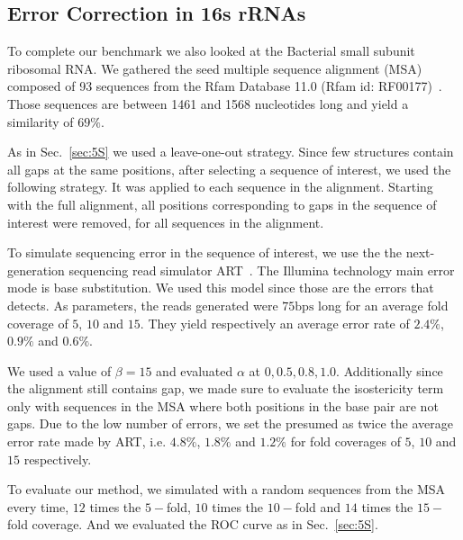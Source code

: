 \subsection{Error Correction in 16s rRNAs}
\label{sec:16S}

To complete our benchmark we also looked at the Bacterial small subunit ribosomal RNA. 
We gathered the seed multiple sequence alignment (MSA) composed of 93 sequences from the Rfam Database 11.0 (Rfam id: RF00177)~\cite{gardner2011rfam}.
Those sequences are between 1461 and 1568 nucleotides long and yield a similarity of $69\%$.

As in Sec.~\ref{sec:5S} we used a leave-one-out strategy. Since few structures contain all gaps 
at the same positions, after selecting a sequence of interest,  we used the following strategy.
 It was applied to each sequence in the alignment. Starting with the full alignment, all positions corresponding to gaps in the sequence of interest were removed, for all sequences in the alignment.  

To simulate sequencing error in the sequence of interest,
 we use the the next-generation sequencing read simulator 
ART~\cite{huang2012art}. The Illumina technology main error mode is base substitution. We used
this model since those
are the errors that \RNApyro detects. As parameters, the reads  generated
were $75\text{bps}$ long for an average fold coverage of $5$, $10$ and $15$. 
 They yield respectively an average error rate of $2.4\%$, $0.9\%$ and $0.6\%$.
 
We used a value of $\beta=15$ and evaluated $\alpha$ at $0, 0.5, 0.8, 1.0$. 
 Additionally since the alignment still contains gap, we made sure to evaluate the isostericity 
 term only
 with sequences in the MSA where both positions in the base pair are not gaps. 
 Due to the low number of errors, we set the presumed as twice the average error rate made by ART, i.e. $4.8\%$, $1.8\%$ and $1.2\%$ for fold coverages of $5$, $10$ and $15$ respectively.

To evaluate our method, we simulated with a random sequences from the MSA every time,
 $12$ times the $5-$fold, $10$ times the $10-$fold and $14$ times the $15-$fold coverage. And we 
 evaluated the ROC curve as in Sec.~\ref{sec:5S}.
 

